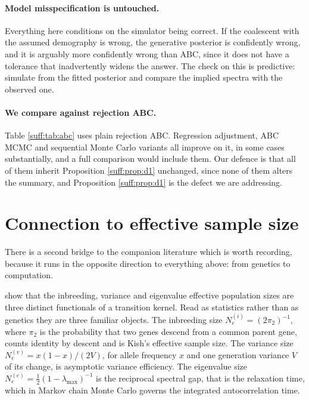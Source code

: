 \paragraph{Model misspecification is untouched.} Everything here conditions on the simulator
being correct. If the coalescent with the assumed demography is wrong, the generative
posterior is confidently wrong, and it is arguably more confidently wrong than ABC, since it
does not have a tolerance that inadvertently widens the answer. The check on this is
predictive: simulate from the fitted posterior and compare the implied spectra with the
observed one.

\paragraph{We compare against rejection ABC.} Table \ref{suff:tab:abc} uses plain rejection
ABC. Regression adjustment, ABC MCMC and sequential Monte Carlo variants all improve on it, in
some cases substantially, and a full comparison would include them. Our defence is that all
of them inherit Proposition \ref{suff:prop:d1} unchanged, since none of them alters the
summary, and Proposition \ref{suff:prop:d1} is the defect we are addressing.

\section{Connection to effective sample size}
\label{suff:sec:ess}

There is a second bridge to the companion literature which is worth recording, because it
runs in the opposite direction to everything above: from genetics to computation.

\citet{suff:ewenshossjer2025} show that the inbreeding, variance and eigenvalue effective
population sizes are three distinct functionals of a transition kernel. Read as statistics
rather than as genetics they are three familiar objects. The inbreeding size
$N_e^{(i)}=(2\pi_2)^{-1}$, where $\pi_2$ is the probability that two genes descend from a
common parent gene, counts identity by descent and is Kish's effective sample size. The
variance size $N_e^{(v)}=x(1-x)/(2V)$, for allele frequency $x$ and one generation variance
$V$ of its change, is asymptotic variance efficiency. The eigenvalue size
$N_e^{(e)}=\tfrac12(1-\lambda_{\max})^{-1}$ is the reciprocal spectral gap, that is the
relaxation time, which in Markov chain Monte Carlo governs the integrated autocorrelation time.

